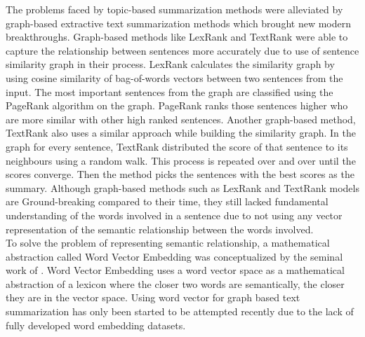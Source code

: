 The problems faced by topic-based summarization methods were alleviated by graph-based extractive text summarization methods which brought new modern breakthroughs. Graph-based methods like LexRank \cite{Erkan-lexRank-2004} and TextRank \cite{mihalcea-2004-textrank} were able to capture the relationship between sentences more accurately due to use of sentence similarity graph in their process. LexRank \cite{Erkan-lexRank-2004} calculates the similarity graph by using cosine similarity of bag-of-words vectors between two sentences from the input. The most important sentences from the graph are classified using the PageRank \cite{page-PageRank-1999} algorithm on the graph. PageRank ranks those sentences higher who are more similar with other high ranked sentences. Another graph-based method, TextRank \cite{mihalcea-2004-textrank} also uses a similar approach while building the similarity graph. In the graph for every sentence, TextRank distributed the score of that sentence to its neighbours using a random walk. This process is repeated over and over until the scores converge. Then the method picks the sentences with the best scores as the summary. Although graph-based methods such as LexRank and TextRank models are Ground-breaking compared to their time, they still lacked fundamental understanding of the words involved in a sentence due to not using any vector representation of the semantic relationship between the words involved.\\

To solve the problem of representing semantic relationship, a mathematical abstraction called Word Vector Embedding was conceptualized by the seminal work of \citeauthor{salton-1975-word-vector} \cite{salton-1975-word-vector}. Word Vector Embedding uses a word vector space as a mathematical abstraction of a lexicon where the closer two words are semantically, the closer they are in the vector space. Using word vector for graph based text summarization has only been started to be attempted recently \cite{Jain-2017-word-vector-embedding-summary} due to the lack of fully developed word embedding datasets.\\

